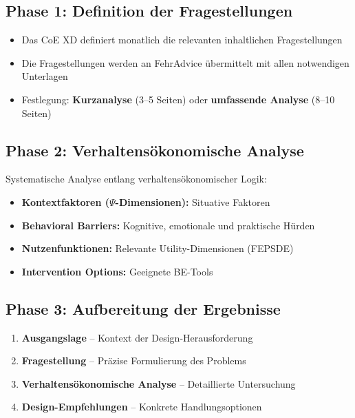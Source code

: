\documentclass[11pt,a4paper]{article}
\begin{document}
\subsection{Phase 1: Definition der Fragestellungen}

\begin{itemize}
    \item Das CoE XD definiert monatlich die relevanten inhaltlichen Fragestellungen
    \item Die Fragestellungen werden an FehrAdvice übermittelt mit allen notwendigen Unterlagen
    \item Festlegung: \textbf{Kurzanalyse} (3--5 Seiten) oder \textbf{umfassende Analyse} (8--10 Seiten)
\end{itemize}

\subsection{Phase 2: Verhaltensökonomische Analyse}

Systematische Analyse entlang verhaltensökonomischer Logik:

\begin{itemize}
    \item \textbf{Kontextfaktoren ($\Psi$-Dimensionen):} Situative Faktoren
    \item \textbf{Behavioral Barriers:} Kognitive, emotionale und praktische Hürden
    \item \textbf{Nutzenfunktionen:} Relevante Utility-Dimensionen (FEPSDE)
    \item \textbf{Intervention Options:} Geeignete BE-Tools
\end{itemize}

\subsection{Phase 3: Aufbereitung der Ergebnisse}

\begin{fainfobox}
\begin{enumerate}
    \item \textbf{Ausgangslage} -- Kontext der Design-Herausforderung
    \item \textbf{Fragestellung} -- Präzise Formulierung des Problems
    \item \textbf{Verhaltensökonomische Analyse} -- Detaillierte Untersuchung
    \item \textbf{Design-Empfehlungen} -- Konkrete Handlungsoptionen
\end{enumerate}
\end{fainfobox}
\end{document}
